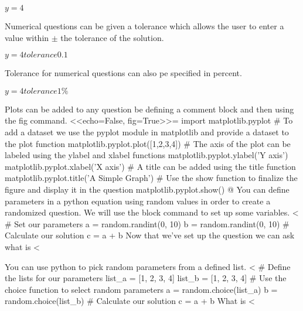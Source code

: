 \documentclass[12pt]{exam}
\begin{document}
\begin{questions}
\begin{solution}
                    $y=4$
                \end{solution}
                Numerical questions can be given a tolerance which allows the user to enter a value within $\pm$ the
                tolerance of the solution.
                \begin{solution}
                    $y=4 tolerance 0.1$
                \end{solution}
                Tolerance for numerical questions can also pe specified in percent.
                \begin{solution}
                    $y=4 tolerance 1\%$
                \end{solution}
                Plots can be added to any question be defining a comment block and then using the fig command.
<<echo=False, fig=True>>=
import matplotlib.pyplot
# To add a dataset we use the pyplot module in matplotlib and provide a dataset to the plot function
matplotlib.pyplot.plot([1,2,3,4])
# The axis of the plot can be labeled using the ylabel and xlabel functions
matplotlib.pyplot.ylabel('Y axis')
matplotlib.pyplot.xlabel('X axis')
# A title can be added using the title function
matplotlib.pyplot.title('A Simple Graph')
# Use the show function to finalize the figure and display it in the question
matplotlib.pyplot.show()
@
                You can define parameters in a python equation using random values in order to create a randomized
                question. We will use the block command to set up some variables.
<%
# Set our parameters
a = random.randint(0, 10)
b = random.randint(0, 10)
# Calculate our solution
c = a + b
                Now that we've set up the question we can ask what is <%
                \begin{solution}
                    $<%
                \end{solution}
                You can use python to pick random parameters from a defined list.
<%
# Define the lists for our parameters
list_a = [1, 2, 3, 4]
list_b = [1, 2, 3, 4]
# Use the choice function to select random parameters
a = random.choice(list_a)
b = random.choice(list_b)
# Calculate our solution
c = a + b
                What is <%

\end{questions}
\end{document}
